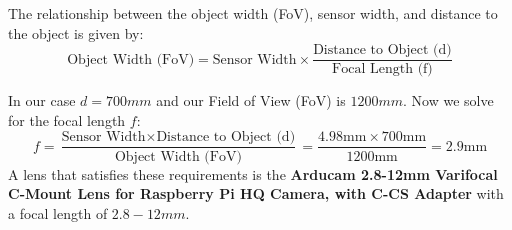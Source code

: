 The relationship between the object width (FoV), sensor width, and distance to the object is given by:
\begin{equation}
    \text{Object Width (FoV)} = \text{Sensor Width} \times \frac{\text{Distance to Object (d)}}{\text{Focal Length (f)}}\label{eq:lens_equation}
\end{equation}


In our case $d = 700mm$ and our Field of View (FoV) is $1200mm$.
Now we solve for the focal length $f$:
\begin{equation}
    \label{eq:focal_length}
    f = \frac{\text{Sensor Width} \times \text{Distance to Object (d)}}{\text{Object Width (FoV)}} = \frac{4.98\text{mm} \times 700\text{mm}}{1200\text{mm}} = 2.9\text{mm}
\end{equation}
A lens that satisfies these requirements is the \textbf{Arducam 2.8-12mm Varifocal C-Mount Lens for Raspberry Pi HQ Camera, with C-CS Adapter} with a focal length of $2.8-12mm$.